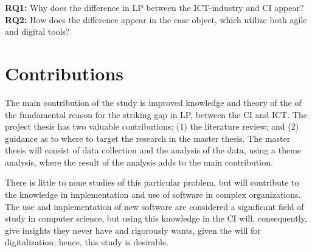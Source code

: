 {\bf RQ1:} Why does the difference in LP between the ICT-industry and CI appear? \\

{\bf RQ2:} How does the difference appear in the case object, which utilize both agile and digital tools?

\section*{Contributions}



The main contribution of the study is improved knowledge and theory of the of the fundamental reason for the striking gap in LP, between the CI and ICT. The project thesis has two valuable contributions: (1) the literature review; and (2) guidance as to where to target the research in the master thesis. The master thesis will consist of data collection and the analysis of the data, using a theme analysis, where the result of the analysis adds to the main contribution. 

There is little to none studies of this particular problem, but will contribute to the knowledge in implementation and use of software in complex organizations. The use and implementation of new software are considered a significant field of study in computer science, but using this knowledge in the CI will, consequently, give insights they never have and rigorously wants, given the will for digitalization; hence, this study is desirable.

